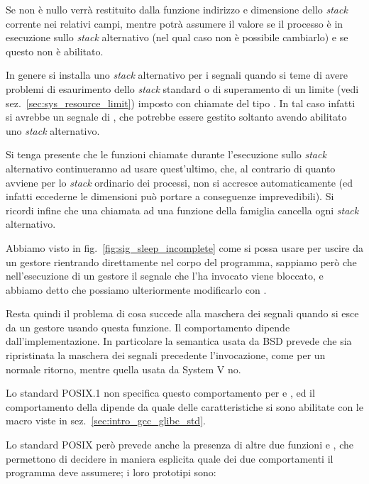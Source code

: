 Se  non è nullo verrà restituito dalla funzione indirizzo e
dimensione dello \textit{stack} corrente nei relativi campi, mentre
 potrà assumere il valore  se il processo è
in esecuzione sullo \textit{stack} alternativo (nel qual caso non è possibile
cambiarlo) e  se questo non è abilitato.

In genere si installa uno \textit{stack} alternativo per i segnali quando si
teme di avere problemi di esaurimento dello \textit{stack} standard o di
superamento di un limite (vedi sez.~\ref{sec:sys_resource_limit}) imposto con
chiamate del tipo .  In tal caso
infatti si avrebbe un segnale di , che potrebbe essere gestito
soltanto avendo abilitato uno \textit{stack} alternativo.

Si tenga presente che le funzioni chiamate durante l'esecuzione sullo
\textit{stack} alternativo continueranno ad usare quest'ultimo, che, al
contrario di quanto avviene per lo \textit{stack} ordinario dei processi, non
si accresce automaticamente (ed infatti eccederne le dimensioni può portare a
conseguenze imprevedibili).  Si ricordi infine che una chiamata ad una
funzione della famiglia  cancella ogni \textit{stack} alternativo.

Abbiamo visto in fig.~\ref{fig:sig_sleep_incomplete} come si possa usare
 per uscire da un gestore rientrando direttamente nel corpo
del programma, sappiamo però che nell'esecuzione di un gestore il segnale
che l'ha invocato viene bloccato, e abbiamo detto che possiamo ulteriormente
modificarlo con . 

Resta quindi il problema di cosa succede alla maschera dei segnali quando si
esce da un gestore usando questa funzione. Il comportamento dipende
dall'implementazione. In particolare la semantica usata da BSD prevede che sia
ripristinata la maschera dei segnali precedente l'invocazione, come per un
normale ritorno, mentre quella usata da System V no.

Lo standard POSIX.1 non specifica questo comportamento per  e
, ed il comportamento della  dipende da quale delle
caratteristiche si sono abilitate con le macro viste in
sez.~\ref{sec:intro_gcc_glibc_std}.

Lo standard POSIX però prevede anche la presenza di altre due funzioni
 e , che permettono di decidere in maniera
esplicita quale dei due comportamenti il programma deve assumere; i loro
prototipi sono:

